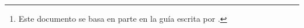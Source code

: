 \maketitle
\begin{abstract}
	En este documento se explican las nociones básicas para entender como se trabaja con referencias bibliográficas en \LaTeX. En particular con el paquete BibLaTeX el cual tiene ciertas ventajas y funciones que también se describen en esta guía.\footnote{Este documento se basa en parte en la guía escrita por \cite{biblatex}.}
\end{abstract}